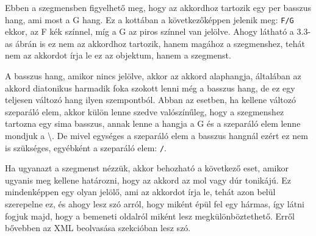 Ebben a szegmensben figyelhető meg, hogy az akkordhoz tartozik egy per basszus hang, ami most a G hang. Ez a kottában a következőképpen jelenik meg: \texttt{F/G} ekkor, az F kék színnel, míg a G az piros színnel van jelölve. Ahogy látható a 3.3-as ábrán is ez nem az akkordhoz tartozik, hanem magához a szegmenshez, tehát nem az akkordot írja le ez az objektum, hanem a szegmenst. \par
A basszus hang, amikor nincs jelölve, akkor az akkord alaphangja, általában az akkord diatonikus harmadik foka szokott lenni még a basszus hang, de ez egy teljesen változó hang ilyen szempontból. Abban az esetben, ha kellene változó szeparáló elem, akkor külön lenne szedve valószínűleg, hogy a szegmenshez tartozna egy sima basszus, annak lenne a hangja a G és a szeparáló elem lenne mondjuk a \textbackslash. De mivel egységes a szeparáló elem a basszus hangnál ezért ez nem is szükséges, egyébként a szeparáló elem: \texttt{/}.
\par
Ha ugyanazt a szegmenst nézzük, akkor behozható a következő eset, amikor ugyanis meg kellene határozni, hogy az akkord az mol vagy dúr tonikájú. Ez mindenképpen egy olyan jelölő, ami az akkordot írja le, tehát azon belül szerepelne ez, és ahogy lesz szó arról, hogy miként épül fel egy hármas, így látni fogjuk majd, hogy a bemeneti oldalról miként lesz megkülönböztethető. Erről bővebben az XML beolvasása szekcióban lesz szó.
\par
\newpage

